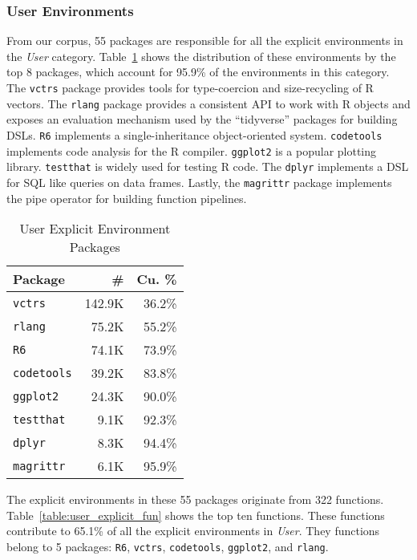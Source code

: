 \documentclass[10pt,review,sigplan,authorversion=true]{acmart}
\renewcommand{\c}[1]{\lstinline |#1|\xspace}
\begin{document}
\subsubsection{User Environments}

From our corpus, 55 packages are responsible for all the explicit environments
in the \emph{User} category. Table~\ref{table:user_explicit_pack} shows the
distribution of these environments by the top 8 packages, which account for
95.9\% of the environments in this category. The \c{vctrs} package provides
tools for type-coercion and size-recycling of R vectors. The \c{rlang}
package provides a consistent API to work with R objects and exposes an
evaluation mechanism used by the ``tidyverse'' packages for building DSLs.
\c{R6} implements a single-inheritance object-oriented system.
\c{codetools} implements code analysis for the R compiler. \c{ggplot2} is
a popular plotting library. \c{testthat} is widely used for testing R code.
The \c{dplyr} implements a DSL for SQL like queries on data frames.
Lastly, the \c{magrittr} package implements the pipe operator for building
function pipelines.

\begin{table}[!h]
  \small
  \caption{User Explicit Environment Packages} \label{table:user_explicit_pack}
  \centering
  \begin{tabular}{lrr}
    \toprule
    \textbf{Package}&\textbf{\#}&\textbf{Cu. \%}\\
    \midrule
    \c{vctrs}&142.9K&36.2\%\\
    \c{rlang}&75.2K&55.2\%\\
    \c{R6}&74.1K&73.9\%\\
    \c{codetools}&39.2K&83.8\%\\
    \c{ggplot2}&24.3K&90.0\%\\
    \c{testthat}&9.1K&92.3\%\\
    \c{dplyr}&8.3K&94.4\%\\
    \c{magrittr}&6.1K&95.9\%\\
    \bottomrule
  \end{tabular}
\end{table}

The explicit environments in these 55 packages originate from 322 functions.
Table~\ref{table:user_explicit_fun} shows the top ten functions. These functions
contribute to 65.1\% of all the explicit environments in \emph{User}. They
functions belong to 5 packages: \c{R6}, \c{vctrs}, \c{codetools},
\c{ggplot2}, and \c{rlang}.
\end{document}
